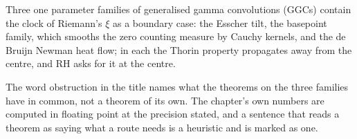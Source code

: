 \label{chap:tf}

Three one parameter families of generalised gamma convolutions (GGCs) contain the clock of Riemann's $\xi$ as a boundary case: the Esscher tilt, the basepoint family, which smooths the zero counting measure by Cauchy kernels, and the de Bruijn Newman heat flow; in each the Thorin property propagates away from the centre, and RH asks for it at the centre.

The word obstruction in the title names what the theorems on the three families have in common, not a theorem of its own. The chapter's own numbers are computed in floating point at the precision stated, and a sentence that reads a theorem as saying what a route needs is a heuristic and is marked as one.
